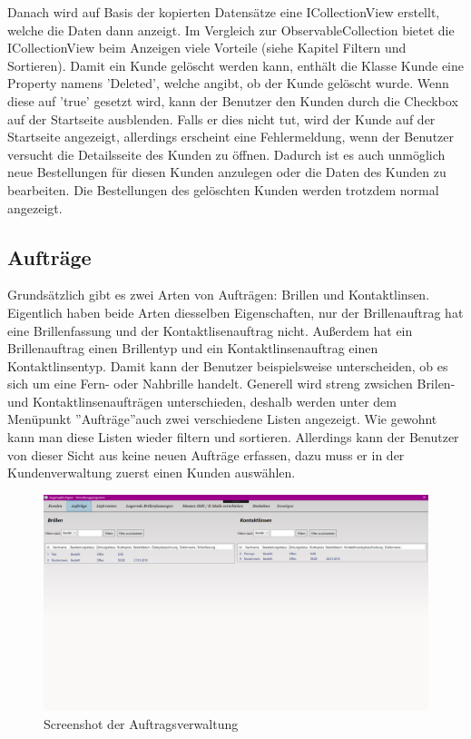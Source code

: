 Danach wird auf Basis der kopierten Datensätze eine ICollectionView erstellt, welche die Daten dann anzeigt. Im Vergleich zur ObservableCollection bietet die ICollectionView beim Anzeigen viele Vorteile (siehe Kapitel Filtern und Sortieren). 
Damit ein Kunde gelöscht werden kann, enthält die Klasse Kunde eine Property namens 'Deleted', welche angibt, ob der Kunde gelöscht wurde. Wenn diese auf 'true' gesetzt wird, kann der Benutzer den Kunden durch die Checkbox auf der Startseite ausblenden. Falls er dies nicht tut, wird der Kunde auf der Startseite angezeigt, allerdings erscheint eine Fehlermeldung, wenn der Benutzer versucht die Detailsseite des Kunden zu öffnen. Dadurch ist es auch unmöglich neue Bestellungen für diesen Kunden anzulegen oder die Daten des Kunden zu bearbeiten. Die Bestellungen des gelöschten Kunden werden trotzdem normal angezeigt.
\subsection{Aufträge}
Grundsätzlich gibt es zwei Arten von Aufträgen: Brillen und Kontaktlinsen. Eigentlich haben beide Arten diesselben Eigenschaften, nur der Brillenauftrag hat eine Brillenfassung und der Kontaktlisenauftrag nicht. Außerdem hat ein Brillenauftrag einen Brillentyp und ein Kontaktlinsenauftrag einen Kontaktlinsentyp. Damit kann der Benutzer beispielsweise unterscheiden, ob es sich um eine Fern- oder Nahbrille handelt. Generell wird streng zwsichen Brilen- und Kontaktlinsenaufträgen unterschieden, deshalb werden unter dem Menüpunkt ''Aufträge''auch zwei verschiedene Listen angezeigt. Wie gewohnt kann man diese Listen wieder filtern und sortieren. Allerdings kann der Benutzer von dieser Sicht aus keine neuen Aufträge erfassen, dazu muss er in der Kundenverwaltung zuerst einen Kunden auswählen. 
\begin{figure}[H]
\begin{center}
	\includegraphics[scale=.25]{images/Auftraege.png}
\end{center}
	\caption{Screenshot der Auftragsverwaltung}
	\label{fig:sample}
\end{figure}
